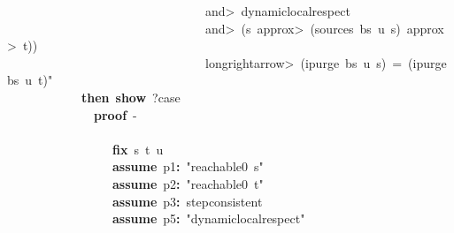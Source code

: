 \documentclass{article}
\newcommand{\syntaxKEYWORDA}[1]{\textcolor[rgb]{0.0,0.4,0.6}{\textbf{#1}}}
\newcommand{\syntaxKEYWORDC}[1]{\textcolor[rgb]{0.0,0.6,1.0}{\textbf{#1}}}
\newcommand{\syntaxLITERALA}[1]{\textcolor[rgb]{1.0,0.0,0.8}{#1}}
\newcommand{\syntaxOPERATOR}[1]{\textcolor[rgb]{0.0,0.0,0.0}{\textbf{#1}}}
\newcommand{\syntaxKEYWORDA}[1]{\textcolor[rgb]{0.0,0.4,0.6}{\textbf{#1}}}
\newcommand{\syntaxKEYWORDC}[1]{\textcolor[rgb]{0.0,0.6,1.0}{\textbf{#1}}}
\newcommand{\syntaxLITERALA}[1]{\textcolor[rgb]{1.0,0.0,0.8}{#1}}
\newcommand{\syntaxOPERATOR}[1]{\textcolor[rgb]{0.0,0.0,0.0}{\textbf{#1}}}
\newcommand{\syntaxKEYWORDA}[1]{\textcolor[rgb]{0.0,0.4,0.6}{\textbf{#1}}}
\newcommand{\syntaxKEYWORDC}[1]{\textcolor[rgb]{0.0,0.6,1.0}{\textbf{#1}}}
\newcommand{\syntaxLITERALA}[1]{\textcolor[rgb]{1.0,0.0,0.8}{#1}}
\newcommand{\syntaxOPERATOR}[1]{\textcolor[rgb]{0.0,0.0,0.0}{\textbf{#1}}}
\newcommand{\syntaxKEYWORDA}[1]{\textcolor[rgb]{0.0,0.4,0.6}{#1}}
\newcommand{\syntaxKEYWORDC}[1]{\textcolor[rgb]{0.0,0.6,1.0}{#1}}
\newcommand{\syntaxLITERALA}[1]{\textcolor[rgb]{1.0,0.0,0.8}{\textbf{#1}}}
\newcommand{\syntaxOPERATOR}[1]{\textcolor[rgb]{0.0,0.0,0.0}{#1}}
\newcommand{\syntaxKEYWORDA}[1]{\textcolor[rgb]{0.0,0.4,0.6}{\textbf{#1}}}
\newcommand{\syntaxKEYWORDC}[1]{\textcolor[rgb]{0.0,0.6,1.0}{\textbf{#1}}}
\newcommand{\syntaxLITERALA}[1]{\textcolor[rgb]{1.0,0.0,0.8}{#1}}
\newcommand{\syntaxOPERATOR}[1]{\textcolor[rgb]{0.0,0.0,0.0}{\textbf{#1}}}
\newcommand{\syntaxKEYWORDA}[1]{\textcolor[rgb]{0.0,0.4,0.6}{\textbf{#1}}}
\newcommand{\syntaxKEYWORDC}[1]{\textcolor[rgb]{0.0,0.6,1.0}{\textbf{#1}}}
\newcommand{\syntaxLITERALA}[1]{\textcolor[rgb]{1.0,0.0,0.8}{#1}}
\newcommand{\syntaxOPERATOR}[1]{\textcolor[rgb]{0.0,0.0,0.0}{\textbf{#1}}}
\begin{document}
\syntaxLITERALA{{\ }{\ }{\ }{\ }{\ }{\ }{\ }{\ }{\ }{\ }{\ }{\ }{\ }{\ }{\ }{\ }{\ }{\ }{\ }{\ }{\ }{\ }{\ }{\ }{\ }{\ }{\ }{\ }{\ }{\ }{\ }{\ }\<and>{\ }dynamic\usebox{\underscorebox}local\usebox{\underscorebox}respect{\ }}\hspace*{\fill}\\
\syntaxLITERALA{{\ }{\ }{\ }{\ }{\ }{\ }{\ }{\ }{\ }{\ }{\ }{\ }{\ }{\ }{\ }{\ }{\ }{\ }{\ }{\ }{\ }{\ }{\ }{\ }{\ }{\ }{\ }{\ }{\ }{\ }{\ }{\ }\<and>{\ }(s{\ }\<approx>{\ }(sources{\ }bs{\ }u{\ }s){\ }\<approx>{\ }t))}\hspace*{\fill}\\
\syntaxLITERALA{{\ }{\ }{\ }{\ }{\ }{\ }{\ }{\ }{\ }{\ }{\ }{\ }{\ }{\ }{\ }{\ }{\ }{\ }{\ }{\ }{\ }{\ }{\ }{\ }{\ }{\ }{\ }{\ }{\ }{\ }{\ }{\ }\<longrightarrow>{\ }(ipurge{\ }bs{\ }u{\ }s){\ }={\ }(ipurge{\ }bs{\ }u{\ }t)"}\hspace*{\fill}\\
{\ }{\ }{\ }{\ }{\ }{\ }{\ }{\ }{\ }{\ }{\ }{\ }\syntaxKEYWORDA{then}{\ }\syntaxKEYWORDC{show}{\ }?case\hspace*{\fill}\\
{\ }{\ }{\ }{\ }{\ }{\ }{\ }{\ }{\ }{\ }{\ }{\ }{\ }{\ }\syntaxKEYWORDA{proof}{\ }{-}\hspace*{\fill}\\
{\ }{\ }{\ }{\ }{\ }{\ }{\ }{\ }{\ }{\ }{\ }{\ }{\ }{\ }\syntaxKEYWORDA{\usebox{\opencurlybracket}}\hspace*{\fill}\\
{\ }{\ }{\ }{\ }{\ }{\ }{\ }{\ }{\ }{\ }{\ }{\ }{\ }{\ }{\ }{\ }{\ }\syntaxKEYWORDC{fix}{\ }s{\ }t{\ }u\hspace*{\fill}\\
{\ }{\ }{\ }{\ }{\ }{\ }{\ }{\ }{\ }{\ }{\ }{\ }{\ }{\ }{\ }{\ }{\ }\syntaxKEYWORDC{assume}{\ }p1\syntaxOPERATOR{:}{\ }\syntaxLITERALA{"reachable0{\ }s"}\hspace*{\fill}\\
{\ }{\ }{\ }{\ }{\ }{\ }{\ }{\ }{\ }{\ }{\ }{\ }{\ }{\ }{\ }{\ }{\ }\syntaxKEYWORDC{assume}{\ }p2\syntaxOPERATOR{:}{\ }\syntaxLITERALA{"reachable0{\ }t"}\hspace*{\fill}\\
{\ }{\ }{\ }{\ }{\ }{\ }{\ }{\ }{\ }{\ }{\ }{\ }{\ }{\ }{\ }{\ }{\ }\syntaxKEYWORDC{assume}{\ }p3\syntaxOPERATOR{:}{\ }step\usebox{\underscorebox}consistent\hspace*{\fill}\\
{\ }{\ }{\ }{\ }{\ }{\ }{\ }{\ }{\ }{\ }{\ }{\ }{\ }{\ }{\ }{\ }{\ }\syntaxKEYWORDC{assume}{\ }p5\syntaxOPERATOR{:}{\ }\syntaxLITERALA{"dynamic\usebox{\underscorebox}local\usebox{\underscorebox}respect"}\hspace*{\fill}\\
\end{document}
